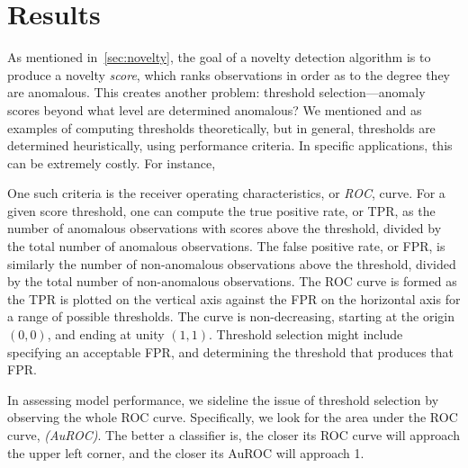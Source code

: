 \section{Results\label{sec:results}}
As mentioned in~\ref{sec:novelty}, the goal of a novelty detection algorithm is 
    to produce a novelty \emph{score}, which ranks observations in order as to 
    the degree they are anomalous.  This creates another problem: threshold 
    selection---anomaly scores beyond what level are determined anomalous?  We 
    mentioned \cite{clifton2011} and \cite{gu2021} as examples of computing 
    thresholds theoretically, but in general, thresholds are determined 
    heuristically, using performance criteria.  In specific applications, this 
    can be extremely costly.   For instance, 

One such criteria is the receiver operating characteristics, or \emph{ROC}, 
    curve.  For  a given score threshold, one can compute the true positive 
    rate, or TPR, as the number of anomalous observations with scores above the 
    threshold, divided by the total number of anomalous observations.  The 
    false positive rate, or FPR, is similarly the number of non-anomalous 
    observations above the threshold, divided by the total number of 
    non-anomalous observations.  The ROC curve is formed as the TPR is plotted 
    on the vertical axis against the FPR on the horizontal axis for a range of 
    possible thresholds.  The curve is non-decreasing, starting at the origin 
    $(0,0)$, and ending at unity $(1,1)$.  Threshold selection might include 
    specifying an acceptable FPR, and determining the threshold that produces 
    that FPR.

In assessing model performance, we sideline the issue of threshold selection by 
    observing the whole ROC curve.  Specifically, we look for the area under 
    the ROC curve, \emph{(AuROC)}.  The better a classifier is, the closer its 
    ROC curve will approach the upper left corner, and the closer its AuROC will 
    approach 1.


